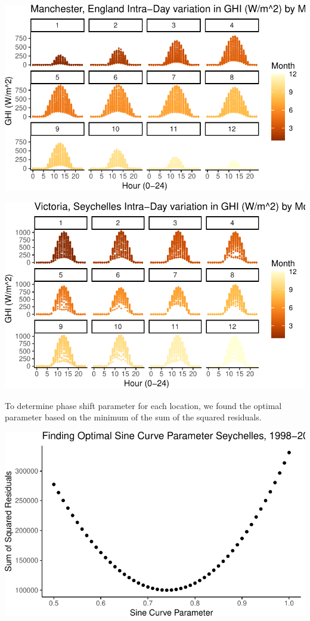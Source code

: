 \documentclass[
  letterpaper,
  DIV=11,
  numbers=noendperiod]{scrartcl}
\begin{document}
\includegraphics{FinalReport_files/figure-pdf/unnamed-chunk-1-1.pdf}

\includegraphics{FinalReport_files/figure-pdf/unnamed-chunk-1-2.pdf}

To determine phase shift parameter for each location, we found the
optimal parameter based on the minimum of the sum of the squared
residuals.

\includegraphics{FinalReport_files/figure-pdf/finding sine parameter Seychelles-1.pdf}
\end{document}
